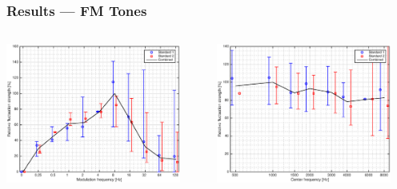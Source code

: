 \documentclass{beamer}
\begin{document}
\begin{frame}
  \frametitle{Results --- FM Tones}
  \begin{columns}
    \begin{column}{0.5\textwidth}
      \includegraphics[width=0.9\textwidth]{FM-fm_all_standards}
    \end{column}
    \begin{column}{0.5\textwidth}
      \includegraphics[width=0.9\textwidth]{FM-fc_all_standards}
    \end{column}
  \end{columns}

  \vspace{2mm}


\end{frame}
\end{document}

